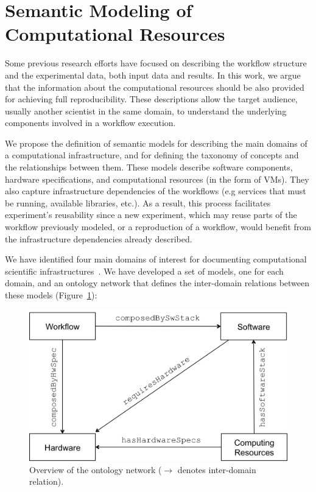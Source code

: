 \section{Semantic Modeling of Computational Resources}
\label{sec:semantic}




Some previous research efforts have focused on describing the workflow structure and the 
experimental data, both input data and results. In this work, we argue that the information 
about the computational resources should be also provided for achieving full reproducibility. 
These descriptions allow the target audience, usually another scientist in the same domain, 
to understand the underlying components involved in a workflow execution.

We propose the definition of semantic models for describing the main domains of a 
computational infrastructure, and for defining the taxonomy of concepts and the relationships 
between them. These models describe software components, hardware specifications, 
and computational resources (in the form of VMs). They also capture infrastructure 
dependencies of the workflows (e.g services that must be running, available libraries, etc.).
 As a result, this process facilitates experiment's reusability since 
a new experiment, which may reuse parts of the workflow previously modeled, or a reproduction 
of a workflow, would benefit from the infrastructure dependencies already described.

We have identified four main domains of interest for documenting computational scientific 
infrastructures~\cite{wicus}. We have developed a set of models, one for each domain, 
and an ontology network that defines the inter-domain relations between these models 
(Figure~\ref{fig:wicusrels}):

\begin{figure}[!b]
	\centering
	\includegraphics[width=.9\linewidth]{figures/wicusrels}
	\caption{Overview of the ontology network ($\rightarrow$ denotes inter-domain relation).}
	\label{fig:wicusrels}
\end{figure}


